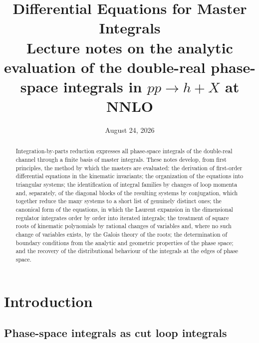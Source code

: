 \documentclass[11pt]{article}
\title{Differential Equations for Master Integrals\\[0.4ex]
\large Lecture notes on the analytic evaluation of the double-real
phase-space integrals in $pp \to h + X$ at NNLO}
\date{August 24, 2026}
\begin{document}
\maketitle

\begin{abstract}
\noindent
Integration-by-parts reduction expresses all phase-space integrals of
the double-real channel through a finite basis of master integrals.
These notes develop, from first principles, the method by which the
masters are evaluated: the derivation of first-order differential
equations in the kinematic invariants; the organization of the
equations into triangular systems; the identification of integral
families by changes of loop momenta and, separately, of the diagonal
blocks of the resulting systems by conjugation, which together reduce
the many systems to a short list of genuinely distinct ones; the
canonical form of the equations, in which the Laurent expansion in the
dimensional regulator integrates order by order into iterated
integrals; the treatment of square roots of kinematic polynomials by
rational changes of variables and, where no such change of variables
exists, by the Galois theory of the roots; the determination of
boundary conditions from the analytic and geometric properties of the
phase space; and the recovery of the distributional behaviour of the
integrals at the edges of phase space.
\end{abstract}

\setcounter{tocdepth}{2}
\tableofcontents

\section{Introduction}
\label{sec:setting}

\subsection{Phase-space integrals as cut loop integrals}
\end{document}

